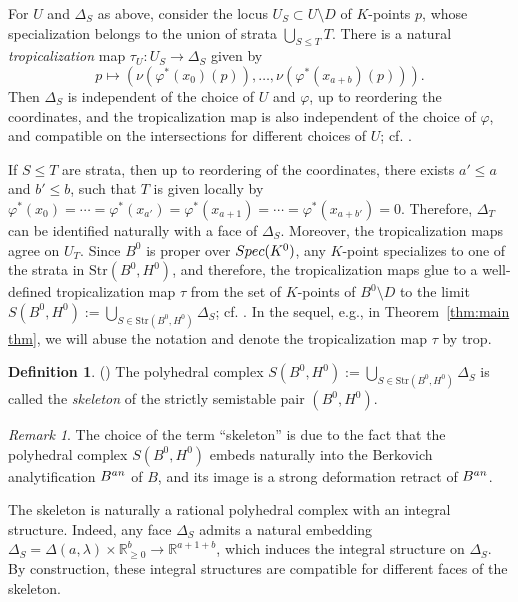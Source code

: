 \documentclass[11pt,reqno]{amsart}
\numberwithin{equation}{section}
\theoremstyle{definition}
\newtheorem{defn}[thm]{Definition}
\newcommand{\trop}{\mathrm{trop}}
\newcommand{\Spec}{{\rm Spec}}
\newcommand{\RR}{{\mathbb R}}
\theoremstyle{remark}
\newtheorem{rem}[thm]{Remark}
\begin{document}
For $U$ and $\Delta_S$ as above, consider the locus $U_S\subset U\setminus D$ of $K$-points $p$, whose specialization belongs to the union of strata $\bigcup_{S\le T} T$. There is a natural {\em tropicalization} map $\tau_U\colon U_S\rightarrow \Delta_S$ given by 
$$p\mapsto \left(\nu\left(\varphi^*(x_0)(p)\right),\dotsc,\nu\left(\varphi^*(x_{a+b})(p)\right)\right).$$ 
Then $\Delta_S$ is independent of the choice of $U$ and $\varphi$, up to reordering the coordinates, and the tropicalization map is also independent of the choice of $\varphi$, and compatible on the intersections for different choices of $U$; cf. \cite[\S 4.3]{GRW16}. 

If $S\le T$ are strata, then up to reordering of the coordinates, there exists $a'\leq a$ and $b'\leq b$, such that $T$ is given locally by $\varphi^*(x_0)=\cdots=\varphi^*(x_{a'})=\varphi^*(x_{a+1})=\cdots=\varphi^*(x_{a+b'})=0.$ Therefore, $\Delta_T$ can be identified naturally with a face of $\Delta_S$. Moreover, the tropicalization maps agree on $U_T$. Since $B^0$ is proper over $\Spec(K^0)$, any $K$-point specializes to one of the strata in $\mathrm{Str}(B^0,H^0)$, and therefore, the tropicalization maps glue to a well-defined tropicalization map $\tau$ from the set of $K$-points of $B^0\setminus D$ to the limit $S(B^0,H^0):=\bigcup_{S\in \mathrm{Str}(B^0,H^0)}\Delta_S$; cf. \cite[\S4.6, \S4.9]{GRW16}. In the sequel, e.g., in Theorem~\ref{thm:main thm}, we will abuse the notation and denote the tropicalization map $\tau$ by $\trop$.

\begin{defn}\label{defn:skeleton}(\cite[\S~4.6]{GRW16})
    The polyhedral complex  
    $S(B^0,H^0):=\bigcup_{S\in \mathrm{Str}(B^0,H^0)}\Delta_S$ is called the {\em skeleton} of the strictly semistable pair $(B^0,H^0)$.
\end{defn}

\begin{rem}
    The choice of the term ``skeleton'' is due to the fact that the polyhedral complex $S(B^0,H^0)$ embeds naturally into the Berkovich analytification $B^{\rm an}$ of $B$, and its image is a strong deformation retract of $B^{\rm an}$.
\end{rem}
The skeleton is naturally a rational polyhedral complex with an integral structure. Indeed, any face $\Delta_S$ admits a natural embedding $\Delta_S=\Delta(a,\lambda)\times \mathbb R^b_{\geq 0}\rightarrow \RR^{a+1+b}$, which induces the integral structure on $\Delta_S$. By construction, these integral structures are compatible for different faces of the skeleton.
\end{document}
